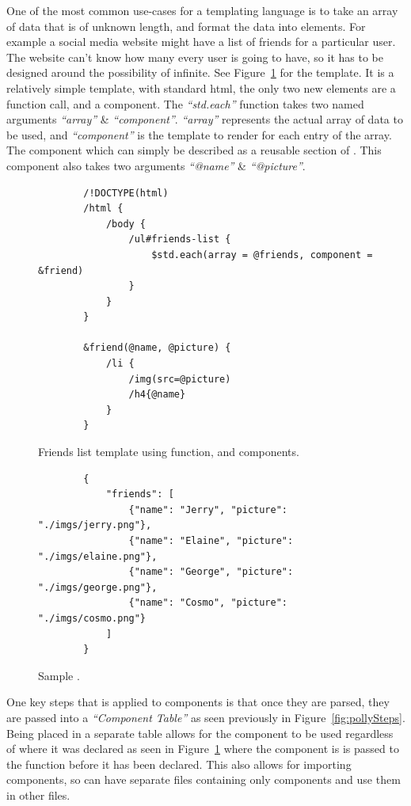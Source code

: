 One of the most common use-cases for a templating language is to take an array of data that is of unknown length, and format the data into elements. For example a social media website might have a list of friends for a particular user. The website can't know how many every user is going to have, so it has to be designed around the possibility of infinite. See Figure~\ref{fig:websiteTemplate} for the template. It is a relatively simple template, with standard html, the only two new elements are a function call, and a component. The \textit{``std.each''} function takes two named arguments \textit{``array''} \& \textit{``component''}. \textit{``array''} represents the actual array of data to be used, and \textit{``component''} is the template to render for each entry of the array. The component which can simply be described as a reusable section of . This component also takes two arguments \textit{``@name''} \& \textit{``@picture''}.

\begin{figure}
    \begin{verbatim}
        /!DOCTYPE(html)
        /html {
            /body {
                /ul#friends-list {
                    $std.each(array = @friends, component = &friend)
                }
            }
        }

        &friend(@name, @picture) {
            /li {
                /img(src=@picture)
                /h4{@name}
            }
        }
    \end{verbatim}
    \caption{Friends list template using function, and components.}
    \label{fig:websiteTemplate}
\end{figure}

\begin{figure}[!htbp]
    \begin{verbatim}
        {
            "friends": [
                {"name": "Jerry", "picture": "./imgs/jerry.png"},
                {"name": "Elaine", "picture": "./imgs/elaine.png"},
                {"name": "George", "picture": "./imgs/george.png"},
                {"name": "Cosmo", "picture": "./imgs/cosmo.png"}
            ]
        }
    \end{verbatim}
    \caption{Sample .}
    \label{fig:sampleFriends}
\end{figure}
One key steps that is applied to components is that once they are parsed, they are passed into a \textit{``Component Table''} as seen previously in Figure~\ref{fig:pollySteps}. Being placed in a separate table allows for the component to be used regardless of where it was declared as seen in Figure~\ref{fig:websiteTemplate} where the component is is passed to the function before it has been declared. This also allows for importing components, so \you{} can have separate files containing only components and use them in other files. 
\newpage

